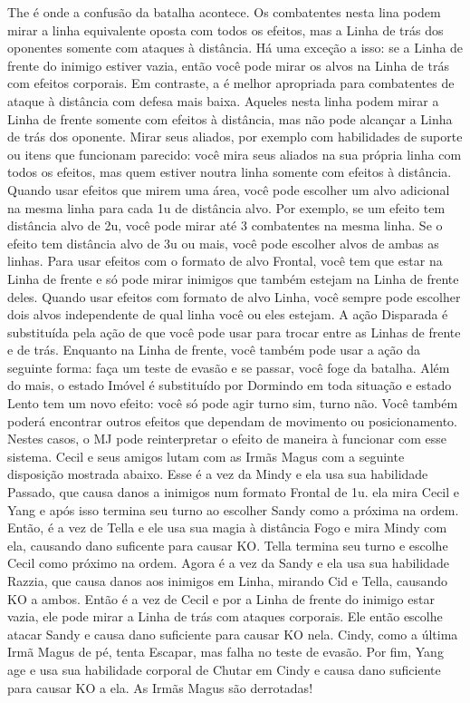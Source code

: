 %
\ofpar
%
The  é onde a confusão da batalha acontece. Os combatentes nesta lina podem mirar a linha equivalente oposta com todos os efeitos, mas a Linha de trás dos oponentes somente com ataques à distância.
Há uma exceção a isso: se a Linha de frente do inimigo estiver vazia, então você pode mirar os alvos na Linha de trás com efeitos corporais.
Em contraste, a  é melhor apropriada para combatentes de ataque à distância com defesa mais baixa.
Aqueles nesta linha podem mirar a Linha de frente somente com efeitos à distância, mas não pode alcançar a Linha de trás dos oponente.
Mirar seus aliados, por exemplo com habilidades de suporte ou itens que funcionam parecido: você mira seus aliados na sua própria linha com todos os efeitos, mas quem estiver noutra linha somente com efeitos à distância.
%
\ofpar
%
Quando usar efeitos que mirem uma área, você pode escolher um alvo adicional na mesma linha para cada 1u de distância alvo.
Por exemplo, se um efeito tem distância alvo de 2u, você pode mirar até 3 combatentes na mesma linha.
Se o efeito tem distância alvo de 3u ou mais, você pode escolher alvos de ambas as linhas.
Para usar efeitos com o formato de alvo Frontal, você tem que estar na Linha de frente e só pode mirar inimigos que também estejam na Linha de frente deles.
Quando usar efeitos com formato de alvo Linha, você sempre pode escolher dois alvos independente de qual linha você ou eles estejam.
%
\ofpar
%
A ação Disparada é substituída pela ação de  que você pode usar para trocar entre as Linhas de frente e de trás.
Enquanto na Linha de frente, você também pode usar a ação  da seguinte forma: faça um teste de evasão e se passar, você foge da batalha.
Além do mais, o estado Imóvel é substituído por Dormindo em toda situação e estado Lento tem um novo efeito: você só pode agir turno sim, turno não.
Você também poderá encontrar outros efeitos que dependam de movimento ou posicionamento.
Nestes casos, o MJ pode reinterpretar o efeito de maneira à funcionar com esse sistema.
%
\vfill
%
{
	Cecil e seus amigos lutam com as Irmãs Magus com a seguinte disposição mostrada abaixo.
	Esse é a vez da Mindy e ela usa sua habilidade Passado, que causa danos a inimigos num formato Frontal de 1u.
	ela mira Cecil e Yang e após isso termina seu turno ao escolher Sandy como a próxima na ordem.
	Então, é a vez de Tella e ele usa sua magia à distância Fogo e mira Mindy com ela, causando dano suficente para causar KO.
	Tella termina seu turno e escolhe Cecil como próximo na ordem.
	Agora é a vez da Sandy e ela usa sua habilidade Razzia, que causa danos aos inimigos em Linha, mirando Cid e Tella, causando KO a ambos.
	Então é a vez de Cecil e por a Linha de frente do inimigo estar vazia, ele pode mirar a Linha de trás com ataques corporais.
	Ele então escolhe atacar Sandy e causa dano suficiente para causar KO nela.
	Cindy, como a última Irmã Magus de pé, tenta Escapar, mas falha no teste de evasão.
	Por fim, Yang age e usa sua habilidade corporal de Chutar em Cindy e causa dano suficiente para causar KO a ela.
	As Irmãs Magus são derrotadas!
}
